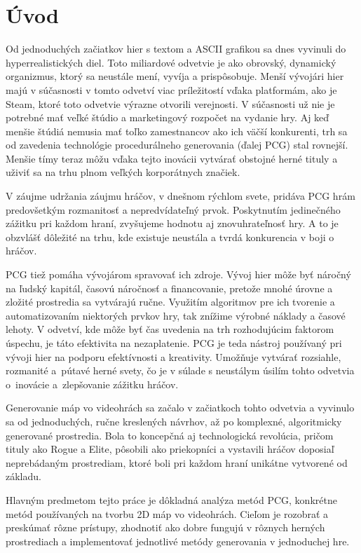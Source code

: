 \chapter{Úvod}

Od jednoduchých začiatkov hier s textom a ASCII grafikou sa dnes vyvinuli do hyperrealistických diel. Toto miliardové odvetvie je ako obrovský, dynamický organizmus, ktorý sa neustále mení, vyvíja a prispôsobuje. Menší vývojári hier majú v súčasnosti v tomto odvetví viac príležitostí vďaka platformám, ako je Steam, ktoré toto odvetvie výrazne otvorili verejnosti. V súčasnosti už nie je potrebné mať veľké štúdio a marketingový rozpočet na vydanie hry. Aj keď menšie štúdiá nemusia mať toľko zamestnancov ako ich väčší konkurenti, trh sa od zavedenia technológie procedurálneho generovania (ďalej PCG) stal rovnejší. Menšie tímy teraz môžu vďaka tejto inovácii vytvárať obstojné herné tituly a uživiť sa na trhu plnom veľkých korporátnych značiek.

V záujme udržania záujmu hráčov, v dnešnom rýchlom svete, pridáva PCG hrám predovšetkým rozmanitosť a nepredvídateľný prvok. Poskytnutím jedinečného zážitku pri každom hraní, zvyšujeme hodnotu aj znovuhrateľnosť hry. A to je obzvlášť dôležité na trhu, kde existuje neustála a tvrdá konkurencia v boji o hráčov.

PCG tiež pomáha vývojárom spravovať ich zdroje. Vývoj hier môže byť náročný na ľudský kapitál, časovú náročnosť a financovanie, pretože mnohé úrovne a zložité prostredia sa vytvárajú ručne. Využitím algoritmov pre ich tvorenie a automatizovaním niektorých prvkov hry, tak znížime výrobné náklady a časové lehoty. V odvetví, kde môže byť čas uvedenia na trh rozhodujúcim faktorom úspechu, je táto efektivita na nezaplatenie. PCG je teda nástroj používaný pri vývoji hier na podporu efektívnosti a kreativity. Umožňuje vytvárať rozsiahle, rozmanité a~pútavé herné svety, čo je v súlade s neustálym úsilím tohto odvetvia o~inovácie a~zlepšovanie zážitku hráčov.

Generovanie máp vo videohrách sa začalo v začiatkoch tohto odvetvia a vyvinulo sa od jednoduchých, ručne kreslených návrhov, až po komplexné, algoritmicky generované prostredia. Bola to koncepčná aj technologická revolúcia, pričom tituly ako Rogue a Elite, pôsobili ako priekopníci a vystavili hráčov doposiaľ neprebádaným prostrediam, ktoré boli pri každom hraní unikátne vytvorené od základu.

Hlavným predmetom tejto práce je dôkladná analýza metód PCG, konkrétne metód používaných na tvorbu 2D máp vo videohrách. Cieľom je rozobrať a preskúmať rôzne prístupy, zhodnotiť ako dobre fungujú v rôznych herných prostrediach a implementovať jednotlivé metódy generovania v jednoduchej hre.

